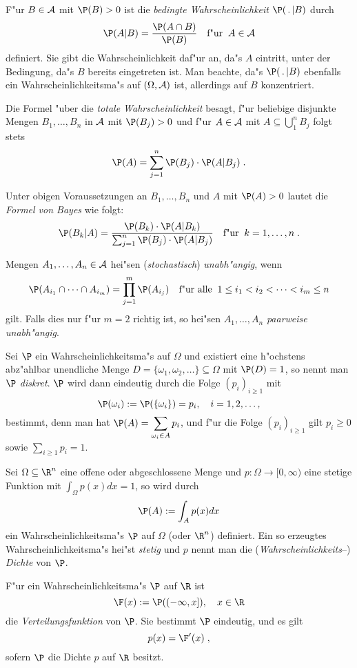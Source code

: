 \item
F"ur $B\in \mathcal A$ mit $\P(B)>0$ ist die {\it bedingte
Wahrscheinlichkeit} $\P(\,.\,|B)$ durch
 \[\P(A|B)=\frac{\P(A\cap B)}{\P(B)}\quad\mbox{f"ur}\;\;A\in\fr A\]
definiert. Sie gibt die Wahrscheinlichkeit daf"ur an, da"s $A$
eintritt, unter der Bedingung, da"s $B$ bereits eingetreten ist. Man
beachte, da"s $\P(\,.\,|B)$ ebenfalls ein Wahrscheinlichkeitsma"s
auf $(\Omega,\mathcal A)$ ist, allerdings auf $B$ konzentriert.
\item
Die Formel "uber die {\it totale Wahrscheinlichkeit} besagt, f"ur
beliebige disjunkte Mengen $B_1,\ldots,B_n$ in $\mathcal A$ mit
$\P(B_j)>0$ und f"ur $A\in \mathcal A$ mit $A\subseteq\bigcup_1^n B_j$
folgt stets
\[\P(A)=\sum_{j=1}^n\P(B_j)\cdot\P(A|B_j)\;.\]
\item
Unter obigen Voraussetzungen an $B_1,\ldots,B_n$ und $A$ mit
$\P(A)>0$ lautet die {\it Formel von Bayes} wie folgt:
\[\P(B_k|A)=\frac{\P(B_k)\cdot\P(A|B_k)}{\sum_{j=1}^n
\P(B_j)\cdot\P(A|B_j)}\quad\mbox{f"ur}\;\;k=1,\ldots,n\;.\]
\item
Mengen $A_1,\ldots,A_n\in\mathcal A$ hei"sen ({\it stochastisch}) {\it
unabh"angig}, wenn
\[\P(A_{i_1}\cap\cdots\cap A_{i_m})=\prod_{j=1}^m\P(A_{i_j})\quad
\mbox{f"ur alle}\;\; 1\le i_1<i_2<\cdots<i_m\le n\]
 gilt. Falls dies nur f"ur $m=2$ richtig ist, so hei"sen
$A_1,\ldots,A_n$ {\it paarweise unabh"angig}.
\item
Sei $\P$ ein Wahrscheinlichkeitsma"s auf $\Omega$ und existiert eine
h"ochstens abz"ahlbar unendliche Menge
$D=\{\omega_1,\omega_2,\ldots\} \subseteq\Omega$ mit $\P(D)=1$, so
nennt man $\P$ {\it diskret}. $\P$ wird dann eindeutig durch die
Folge $(p_i)_{i\ge 1}$ mit
$$
\P(\omega_i):=\P(\{\omega_i\})=p_i,\quad i=1,2,\ldots,
$$
bestimmt, denn man hat $\displaystyle\P(A)=\sum_{\omega_i\in A}
p_i$, und f"ur die Folge $(p_i)_{i\ge 1}$ gilt $p_i\ge 0$ sowie
$\sum_{i\ge 1} p_i=1$.
\item
Sei $\Omega\subseteq\R^n$ eine offene oder abgeschlossene Menge und
$p:\Omega\to[0,\infty)$ eine stetige Funktion mit $\int_\Omega
p(x)dx =1$, so wird durch
\[\P(A):=\int_A p(x)dx\]
ein Wahrscheinlichkeitsma"s $\P$ auf $\Omega$ (oder $\R^n$)
definiert. Ein so erzeugtes Wahrscheinlichkeitsma"s hei"st {\it
stetig} und $p$ nennt man die ({\it Wahrscheinlichkeits}--) {\it
Dichte} von $\P$.
\item
F"ur ein Wahrscheinlichkeitsma"s $\P$ auf $\R$ ist
\[\F(x):=\P((-\infty,x]),\quad x\in\R\]
die {\it Verteilungsfunktion} von $\P$. Sie bestimmt $\P$ eindeutig,
und es gilt
$$
p(x)=\F'(x)\;,
$$
sofern $\P$ die Dichte $p$ auf $\R$ besitzt.
